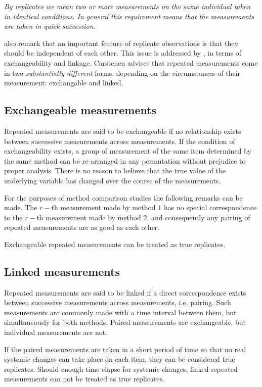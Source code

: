 \documentclass[12pt, a4paper]{report}
\theoremstyle{plain}
\theoremstyle{definition}
\theoremstyle{remark}
\begin{document}
	\emph{By replicates we mean two or more measurements on the same
		individual taken in identical conditions. In general this requirement means that the
		measurements are taken in quick succession.}
	
	\citet{BA99} also remark that an important feature of replicate observations is that they should be independent
	of each other. This issue is addressed by \citet{BXC2010}, in terms of exchangeability and linkage. Carstenen advises that repeated measurements come in two \emph{substantially different} forms, depending on the circumstances of their measurement: exchangable and linked.
	\subsection{Exchangeable measurements}
	Repeated measurements are said to be exchangeable if no relationship exists between successive measurements across measurements. If the condition of exchangeability exists, a group of measurement of the same item determined by the same method can be re-arranged in any permutation without prejudice to proper analysis. There is no reason to believe that the true value of the underlying variable has changed over the course of the measurements.
	
	For the purposes of method comparison studies the following remarks can be made. The $r-$th measurement made by method $1$ has no special correspondence to the $r-$th measurement made by method $2$, and consequently any pairing of repeated measurements are as good as each other.
	
	Exchangeable repeated measurements can be treated as true replicates.
	\subsection{Linked measurements}
	Repeated measurements are said to be linked if a direct correspondence exists between successive measurements across measurements, i.e. pairing. Such measurements are commonly made with a time interval between them, but simultaneously for both methods. Paired measurements are exchangeable, but individual measurements are not.
	
	If the paired measurements are taken
	in a short period of time so that no real systemic changes can take place on each item, they can be considered true replicates.
	Should enough time elapse for systemic changes, linked repeated measurements can not be treated as true replicates.
	
\end{document}
